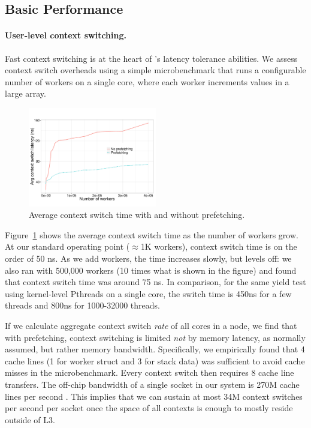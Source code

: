 \subsection{Basic \Grappa Performance}
\label{eval:basic}

\paragraph{User-level context switching.}

Fast context switching is at the heart of \Grappa's
latency tolerance abilities. We assess context switch overheads using a simple
microbenchmark that runs a configurable number of workers on a single core, where each worker 
increments values in a large array. 

\begin{figure}[ht]
    \begin{center}
      \includegraphics[width=0.5\textwidth]{figs/context_switch_time.pdf}
    \end{center}
    \caption{Average context switch time with and without prefetching.}
    \label{fig:context-switch-exp}
\end{figure}

Figure~\ref{fig:context-switch-exp} shows the average context switch
time as the number of workers grow. At our standard operating point
($\approx$1K workers), context switch time is on the order of 50
ns. As we add workers, the time increases slowly, but levels off: we
also ran with 500,000 workers (10 times what is shown in the figure)
and found that context switch time was around 75 ns. In comparison,
for the same yield test using kernel-level Pthreads on a single core,
the switch time is 450ns for a few threads and 800ns for 1000-32000
threads.

If we calculate aggregate context switch \emph{rate} of all
cores in a node, we find that with prefetching, \Grappa context
switching is
limited \emph{not} by memory latency, as normally assumed, but rather memory bandwidth.
Specifically, we empirically found that 4 cache lines (1 for worker
struct and 3 for stack data) was sufficient to avoid cache misses in
the microbenchmark. Every context switch then requires 8 cache line transfers. The off-chip
bandwidth of a single socket in our system is 270M cache lines per
second \cite{porterfield:bw,Nelson:hotpar11}. This implies that
we can sustain at most 34M context switches per second per socket once
the space of all contexts is enough to mostly reside outside of L3.


